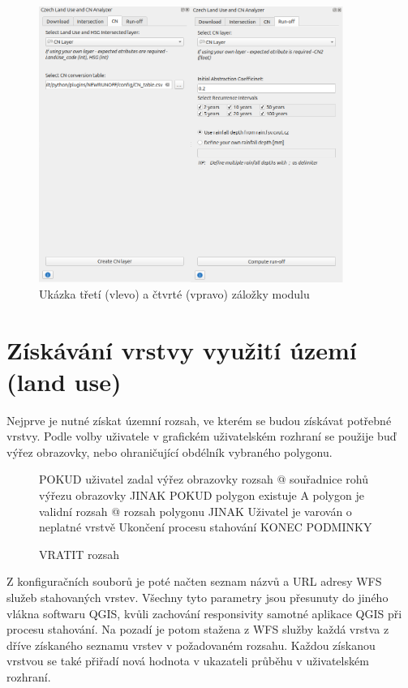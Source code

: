 \documentclass[a4paper,oneside,12pt]{book}
\begin{document}
\begin{figure}[H] \label{obr12b}
\centering
\includegraphics[height=9cm]{pictures/UI2.png}
\caption{Ukázka třetí (vlevo) a čtvrté (vpravo) záložky modulu }
\label{fig:UI2}
\end{figure}


\section{Získávání vrstvy využití území (land use)} \label{landuse}
\hspace{10mm}Nejprve je nutné získat územní rozsah, ve kterém se budou získávat potřebné vrstvy. Podle volby uživatele v grafickém uživatelském rozhraní se použije buď výřez obrazovky, nebo ohraničující obdélník vybraného polygonu. 

\begin{figure}[H]
\begin{pseudocode}[style=mypseudocode, caption={Získání územního rozsahu}, label={kod:extent}]
POKUD uživatel zadal výřez obrazovky
    rozsah @ souřadnice rohů výřezu obrazovky
JINAK POKUD polygon existuje A polygon je validní
    rozsah @ rozsah polygonu
JINAK 
    Uživatel je varován o neplatné vrstvě
    Ukončení procesu stahování
KONEC PODMINKY

VRATIT rozsah

\end{pseudocode}
\end{figure}

\hspace{10mm}Z konfiguračních souborů je poté načten seznam názvů a URL adresy WFS služeb stahovaných vrstev. Všechny tyto parametry jsou přesunuty do jiného vlákna softwaru QGIS, kvůli zachování responsivity samotné aplikace QGIS při procesu stahování. Na pozadí je potom stažena z WFS služby každá vrstva z dříve získaného seznamu vrstev v požadovaném rozsahu. Každou získanou vrstvou se také přiřadí nová hodnota v ukazateli průběhu v uživatelském rozhraní.
\end{document}
